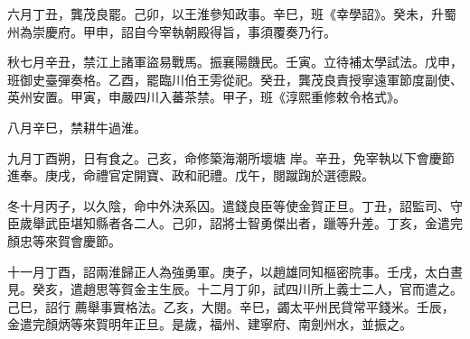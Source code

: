 \begin{pinyinscope}
 六月丁丑，龔茂良罷。己卯，以王淮參知政事。辛巳，班《幸學詔》。癸未，升蜀州為崇慶府。甲申，詔自今宰執朝殿得旨，事須覆奏乃行。



 秋七月辛丑，禁江上諸軍盜易戰馬。振襄陽饑民。壬寅。立待補太學試法。戊申，班御史臺彈奏格。乙酉，罷臨川伯王雱從祀。癸丑，龔茂良責授寧遠軍節度副使、英州安置。甲寅，申嚴四川入蕃茶禁。甲子，班《淳熙重修敕令格式》。



 八月辛巳，禁耕牛過淮。



 九月丁酉朔，日有食之。己亥，命修築海潮所壞塘
 岸。辛丑，免宰執以下會慶節進奉。庚戌，命禮官定開寶、政和祀禮。戊午，閱蹴踘於選德殿。



 冬十月丙子，以久陰，命中外決系囚。遣錢良臣等使金賀正旦。丁丑，詔監司、守臣歲舉武臣堪知縣者各二人。己卯，詔將士智勇傑出者，躐等升差。丁亥，金遣完顏忠等來賀會慶節。



 十一月丁酉，詔兩淮歸正人為強勇軍。庚子，以趙雄同知樞密院事。壬戌，太白晝見。癸亥，遣趙思等賀金主生辰。十二月丁卯，試四川所上義士二人，官而遣之。己巳，詔行
 薦舉事實格法。乙亥，大閱。辛巳，蠲太平州民貸常平錢米。壬辰，金遣完顏炳等來賀明年正旦。是歲，福州、建寧府、南劍州水，並振之。



\end{pinyinscope}